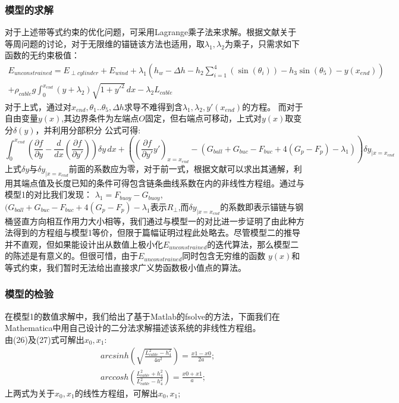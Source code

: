 \documentclass[a4paper,12pt]{ctexart}
\begin{document}
\subsubsection{模型的求解}
对于上述带等式约束的优化问题，可采用Lagrange乘子法来求解。根据文献\cite{CalculusVariation}关于等周问题的讨论，对于无限维的锚链该方法也适用，取$\lambda_1,\lambda_2$为乘子，只需求如下函数的无约束极值：
\begin{multline}
E_{unconstrained}=E_{\perp cylinder}+E_{wind}
+\lambda_1 (h_w-\Delta h-h_2 \sum_{i=1}^4 (\sin(\theta_i))-h_3\sin(\theta_5)-y(x_{end}))\\
+\rho_{cable}g \int_0^{x_{end}} (y+\lambda_2)\sqrt{1+y'^2}\,dx -\lambda_2 L_{cable}
\end{multline}
对于上式，通过对$x_{end},\theta_1..\theta_5,\Delta h$求导不难得到含$\lambda_1,\lambda_2,y'(x_{end})$的方程。
而对于自由变量$y(x)$,其边界条件为左端点$O$固定，但右端点可移动，上式对$y(x)$取变分$\delta(y)$，并利用分部积分
公式可得:
\begin{equation}
\int_0^{x_{end}} (\frac{\partial f}{\partial y}- \frac{d}{dx}(\frac{\partial f}{\partial y'}))\delta y\,dx
+((\frac{\partial f}{\partial y'}y')_{x=x_{end}}-(G_{ball}+G_{buc}-F_{buc}+4(G_p-F_p)-\lambda_1))\delta y_{|x=x_{end}}
\end{equation}
上式$\delta y$与$\delta y_{|x=x_{end}}$前面的系数应为零，对于前一式，根据文献\cite{CalculusVariationOfCatenary}可以求出其通解，利用其端点值及长度已知的条件可得包含链条曲线系数在内的非线性方程组。通过与模型1的对比我们发现：
$\lambda_1=F_{buoy}-G_{buoy}$,$(G_{ball}+G_{buc}-F_{buc}+4(G_p-F_p)-\lambda_1$表示$R_{\perp}$,而$\delta y_{|x=x_{end}}$的系数即表示锚链与钢桶竖直方向相互作用力大小相等，我们通过与模型一的对比进一步证明了由此种方法得到的方程组与模型1等价，但限于篇幅证明过程此处略去。尽管模型二的推导并不直观，但如果能设计出从数值上极小化$E_{unconstrained}$的迭代算法，那么模型二的陈述是有意义的。但很可惜，由于$E_{unconstrained}$同时包含无穷维的函数
$y(x)$和等式约束，我们暂时无法给出直接求广义势函数极小值点的算法。
\subsubsection{模型的检验}
在模型1的数值求解中，我们给出了基于Matlab的fsolve的方法，下面我们在Mathematica中用自己设计的二分法求解描述该系统的非线性方程组。\\

由(26)及(27)式可解出$x_0,x_1$:
\begin{align}
& arcsinh (\sqrt{\frac{L_{cable}^2-h_4^2}{4a^2}})=\frac{x1-x0}{2a};\\
& arccosh (\frac{L_{cable}^2+h_4^2}{L_{cable}^2-h_4^2})=\frac{x0+x1}{a};
\end{align}
上两式为关于$x_0,x_1$的线性方程组，可解出$x_0,x_1$;
\end{document}
